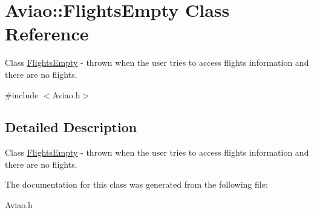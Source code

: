 \hypertarget{class_aviao_1_1_flights_empty}{}\section{Aviao\+:\+:Flights\+Empty Class Reference}
\label{class_aviao_1_1_flights_empty}


Class \hyperlink{class_aviao_1_1_flights_empty}{Flights\+Empty} -\/ thrown when the user tries to access flights information and there are no flights.  




{\ttfamily \#include $<$Aviao.\+h$>$}



\subsection{Detailed Description}
Class \hyperlink{class_aviao_1_1_flights_empty}{Flights\+Empty} -\/ thrown when the user tries to access flights information and there are no flights. 

The documentation for this class was generated from the following file\+:\begin{DoxyCompactItemize}
\item 
Aviao.\+h\end{DoxyCompactItemize}
